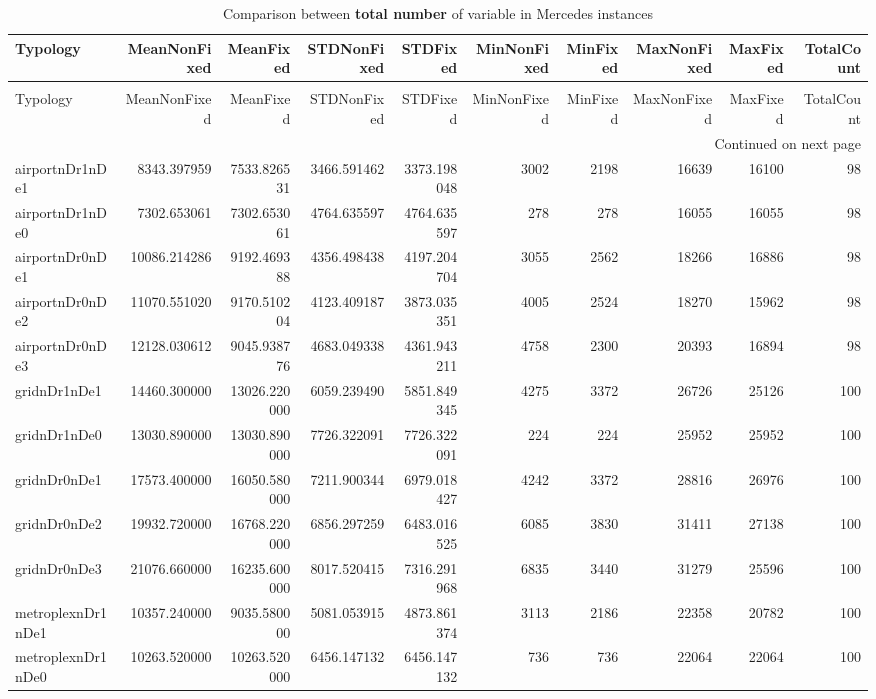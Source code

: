 
\begin{longtable}{|l|r|r|r|r|r|r|r|r|r}
\caption{Comparison between \textbf{total number} of variable in Mercedes instances} \label{table:mercedes:totalVarComparison} \\
\hline
Typology & MeanNonFixed & MeanFixed & STDNonFixed & STDFixed & MinNonFixed & MinFixed & MaxNonFixed & MaxFixed & TotalCount \\
\hline
\endfirsthead
\caption[]{Comparison between \textbf{total number} of variable in Mercedes instances} \\
\hline
Typology & MeanNonFixed & MeanFixed & STDNonFixed & STDFixed & MinNonFixed & MinFixed & MaxNonFixed & MaxFixed & TotalCount \\
\hline
\endhead
\hline
\multicolumn{10}{r}{Continued on next page} \\
\hline
\endfoot
\hline
\endlastfoot
airportnDr1nDe1 & 8343.397959 & 7533.826531 & 3466.591462 & 3373.198048 & 3002 & 2198 & 16639 & 16100 & 98 \\
airportnDr1nDe0 & 7302.653061 & 7302.653061 & 4764.635597 & 4764.635597 & 278 & 278 & 16055 & 16055 & 98 \\
airportnDr0nDe1 & 10086.214286 & 9192.469388 & 4356.498438 & 4197.204704 & 3055 & 2562 & 18266 & 16886 & 98 \\
airportnDr0nDe2 & 11070.551020 & 9170.510204 & 4123.409187 & 3873.035351 & 4005 & 2524 & 18270 & 15962 & 98 \\
airportnDr0nDe3 & 12128.030612 & 9045.938776 & 4683.049338 & 4361.943211 & 4758 & 2300 & 20393 & 16894 & 98 \\
gridnDr1nDe1 & 14460.300000 & 13026.220000 & 6059.239490 & 5851.849345 & 4275 & 3372 & 26726 & 25126 & 100 \\
gridnDr1nDe0 & 13030.890000 & 13030.890000 & 7726.322091 & 7726.322091 & 224 & 224 & 25952 & 25952 & 100 \\
gridnDr0nDe1 & 17573.400000 & 16050.580000 & 7211.900344 & 6979.018427 & 4242 & 3372 & 28816 & 26976 & 100 \\
gridnDr0nDe2 & 19932.720000 & 16768.220000 & 6856.297259 & 6483.016525 & 6085 & 3830 & 31411 & 27138 & 100 \\
gridnDr0nDe3 & 21076.660000 & 16235.600000 & 8017.520415 & 7316.291968 & 6835 & 3440 & 31279 & 25596 & 100 \\
metroplexnDr1nDe1 & 10357.240000 & 9035.580000 & 5081.053915 & 4873.861374 & 3113 & 2186 & 22358 & 20782 & 100 \\
metroplexnDr1nDe0 & 10263.520000 & 10263.520000 & 6456.147132 & 6456.147132 & 736 & 736 & 22064 & 22064 & 100 \\

\end{longtable}
